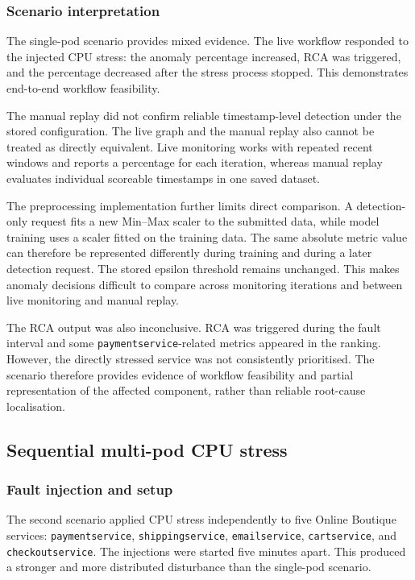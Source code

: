 \subsubsection{Scenario interpretation}

The single-pod scenario provides mixed evidence. The live workflow responded to the injected CPU stress: the anomaly percentage increased, RCA was triggered, and the percentage decreased after the stress process stopped. This demonstrates end-to-end workflow feasibility.

The manual replay did not confirm reliable timestamp-level detection under the stored configuration. The live graph and the manual replay also cannot be treated as directly equivalent. Live monitoring works with repeated recent windows and reports a percentage for each iteration, whereas manual replay evaluates individual scoreable timestamps in one saved dataset.

The preprocessing implementation further limits direct comparison. A detection-only request fits a new Min--Max scaler to the submitted data, while model training uses a scaler fitted on the training data. The same absolute metric value can therefore be represented differently during training and during a later detection request. The stored epsilon threshold remains unchanged. This makes anomaly decisions difficult to compare across monitoring iterations and between live monitoring and manual replay.

The RCA output was also inconclusive. RCA was triggered during the fault interval and some \texttt{paymentservice}-related metrics appeared in the ranking. However, the directly stressed service was not consistently prioritised. The scenario therefore provides evidence of workflow feasibility and partial representation of the affected component, rather than reliable root-cause localisation.

\subsection{Sequential multi-pod CPU stress}

\subsubsection{Fault injection and setup}

The second scenario applied CPU stress independently to five Online Boutique services: \texttt{paymentservice}, \texttt{shippingservice}, \texttt{emailservice}, \texttt{cartservice}, and \texttt{checkoutservice}. The injections were started five minutes apart. This produced a stronger and more distributed disturbance than the single-pod scenario.

